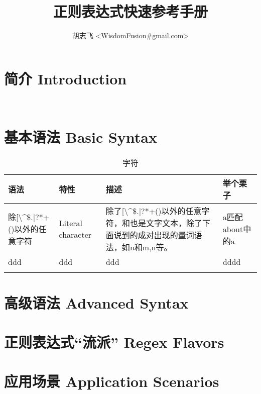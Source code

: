 \documentclass[12pt,a4paper,twoside]{ctexart}
\begin{document}
\title{正则表达式快速参考手册}
\author{胡志飞 <WisdomFusion\#gmail.com>}
\maketitle{}
\thispagestyle{empty}
\clearpage{}

\tableofcontents{}
\thispagestyle{empty}
\clearpage{}

\setcounter{page}{1}

\section[简介]{简介 Introduction}
\label{sec:intro}

\lipsum[1] \\
\lipsum[1]

\section[基本语法]{基本语法 Basic Syntax}
\label{sec:basic-syntax}

\noindent
\begin{table}
  \centering{}
  \begin{tabularx}{.9\textwidth}{llXX}
  \hline{}
    语法 & 特性 & 描述 & 举个栗子 \\ \hline{}
    除[\textbackslash{}\^{}\$.|?*+()以外的任意字符 & Literal character & 除了[\textbackslash{}\^{}\$.|?*+()以外的任意字符，{和}也是文字文本，除了下面说到的成对出现的量词语法，如{n}和{m,n}等。& \colorbox{patterncolor}{a}匹配about中的\colorbox{matchedcolor}{a} \\ \hline{}
    ddd & ddd & ddd & dddd \\ \hline{}
  \end{tabularx}
  \caption{字符}
\end{table}


\section[高级语法]{高级语法 Advanced Syntax}
\label{sec:adv-syntax}


\section[正则表达式“流派”]{正则表达式“流派” Regex Flavors}
\label{sec:flavor}


\section[应用场景]{应用场景 Application Scenarios}
\label{sec:scenarios}
\end{document}
